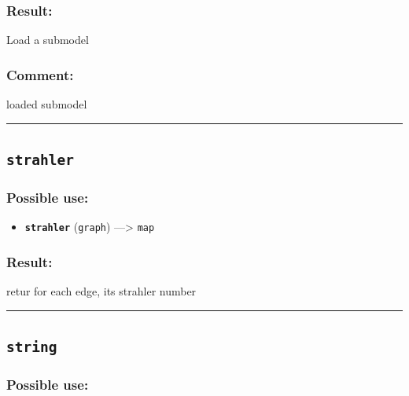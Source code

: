 \documentclass[]{book}
\providecommand{\tightlist}{%
  \setlength{\itemsep}{0pt}\setlength{\parskip}{0pt}}
\theoremstyle{definition}
\theoremstyle{definition}
\theoremstyle{definition}
\theoremstyle{remark}
\begin{document}
\subsubsection{Result:}\label{result-486}

Load a submodel

\subsubsection{Comment:}\label{comment-95}

loaded submodel

\begin{center}\rule{0.5\linewidth}{\linethickness}\end{center}

\subsection{\texorpdfstring{\texttt{strahler}}{strahler}}\label{strahler}

\subsubsection{Possible use:}\label{possible-use-504}

\begin{itemize}
\tightlist
\item
  \textbf{\texttt{strahler}} (\texttt{graph}) ---\textgreater{}
  \texttt{map}
\end{itemize}

\subsubsection{Result:}\label{result-487}

retur for each edge, its strahler number

\begin{center}\rule{0.5\linewidth}{\linethickness}\end{center}

\subsection{\texorpdfstring{\texttt{string}}{string}}\label{string}

\subsubsection{Possible use:}\label{possible-use-505}
\end{document}
